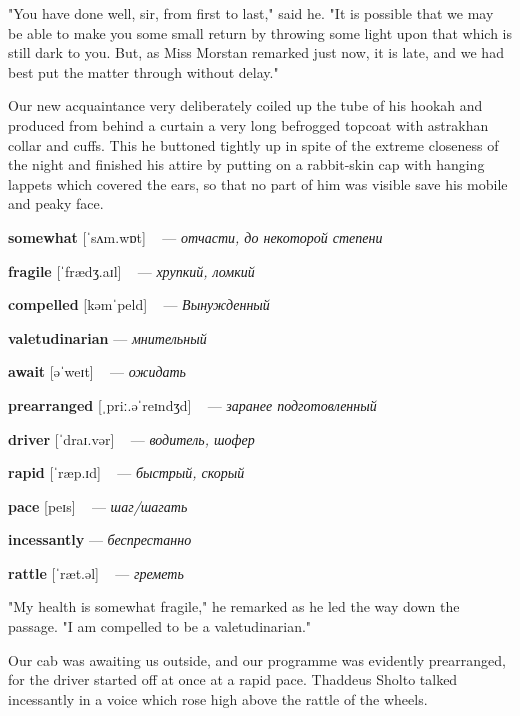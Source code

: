 \documentclass[a4paper,oneside,12pt]{amsart}
\begin{document}
{"You have done well, sir, from first to last," said he. "It is possible that we may be able to make you some small return by throwing some light upon that which is still dark to you. But, as Miss Morstan remarked just now, it is late, and we had best put the matter through without delay."

Our new acquaintance very deliberately coiled up the tube of his hookah and produced from behind a curtain a very long befrogged topcoat with astrakhan collar and cuffs. This he buttoned tightly up in spite of the extreme closeness of the night and finished his attire by putting on a rabbit-skin cap with hanging lappets which covered the ears, so that no part of him was visible save his mobile and peaky face.
\\ } 

{\large 

 {\bf somewhat } [ˈsʌm.wɒt] ~ --- \emph{ отчасти, до некоторой степени }

{\bf fragile } [ˈfrædʒ.aɪl] ~ --- \emph{ хрупкий, ломкий }

{\bf compelled } [kəmˈpeld] ~ --- \emph{ Вынужденный }

{\bf valetudinarian } --- \emph{ мнительный }

{\bf await } [əˈweɪt] ~ --- \emph{ ожидать }

{\bf prearranged } [ˌpriː.əˈreɪndʒd] ~ --- \emph{ заранее подготовленный }

{\bf driver } [ˈdraɪ.vər] ~ --- \emph{ водитель, шофер }

{\bf rapid } [ˈræp.ɪd] ~ --- \emph{ быстрый, скорый }

{\bf pace } [peɪs] ~ --- \emph{ шаг/шагать }

{\bf incessantly } --- \emph{ беспрестанно }

{\bf rattle } [ˈræt.əl] ~ --- \emph{ греметь }

} \vspace{6mm} {\Large 

 
"My health is somewhat fragile," he remarked as he led the way down the passage. "I am compelled to be a valetudinarian."

Our cab was awaiting us outside, and our programme was evidently prearranged, for the driver started off at once at a rapid pace. Thaddeus Sholto talked incessantly in a voice which rose high above the rattle of the wheels.
\\ } 
\end{document}

